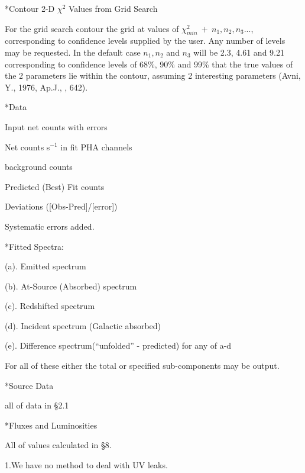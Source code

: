 \**Contour 2-D $\chi^2$ Values from Grid Search

{\list
 
For the grid search contour the grid at values of
$\chi_{min}^{2}~+~n_{1},n_{2},n_{3}$..., corresponding to confidence levels
supplied by the user.  Any number of levels may be requested.  In
the default case
$n_1, n_2$ and $n_3$ will be 2.3, 4.61 and 9.21 corresponding to confidence
levels of 68\%, 90\% and 99\% that the true values of the 2 parameters lie within
the contour, assuming 2 interesting parameters
(Avni, Y., 1976, Ap.J., , 642).

}
 
\**Data

{\list

Input net counts with errors

Net counts s$^{-1}$ in fit PHA channels

background counts

Predicted (Best) Fit counts

Deviations ([Obs-Pred]/[error])

Systematic errors added.
 
}
 
\**Fitted Spectra:

{\list

(a). Emitted spectrum

(b). At-Source (Absorbed) spectrum

(c). Redshifted spectrum

(d). Incident spectrum (Galactic absorbed)

(e). Difference spectrum(``unfolded'' - predicted) for any of a-d
 
For all of these either the total or specified sub-components may be output.

}

\**Source Data

{\list

all of data in \S2.1

}
 
\**Fluxes and Luminosities

{\list
 
All of values calculated in \S8.

}

\vskip 24pt

\centerline{}

\item{1.}We have no method to deal with UV leaks.

